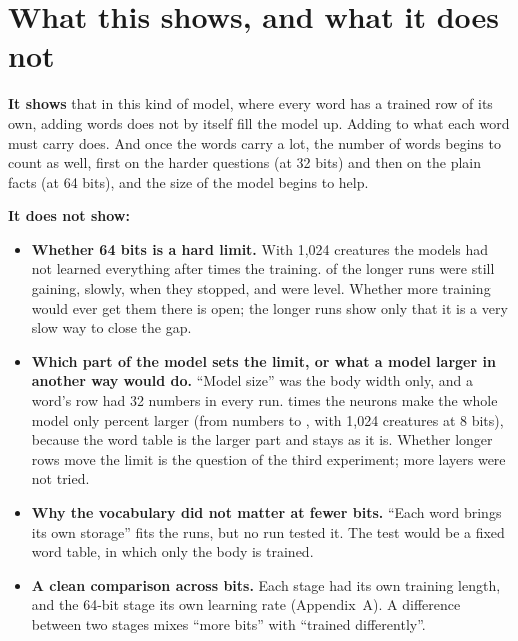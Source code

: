 \documentclass[10pt,letterpaper]{article}
\newcommand{\lead}[1]{\textbf{#1}}               %
\begin{document}
\section{What this shows, and what it does not}

\lead{It shows} that in this kind of model, where every word has a trained row of its own, adding
words does not by itself fill the model up. Adding to what each word must carry does. And once the
words carry a lot, the number of words begins to count as well, first on the harder questions (at
32 bits) and then on the plain facts (at 64 bits), and the size of the model begins to help.

\lead{It does not show:}
\begin{itemize}
\item \lead{Whether 64 bits is a hard limit.} With 1,024 creatures the models had not learned
      everything after \LongerTimesWord{} times the training. \LongerStillWordCap{} of the
      \RunsLongerWord{} longer runs were still gaining, slowly, when they stopped, and
      \LongerLevelWord{} were level. Whether more training would ever get them there is open; the
      longer runs show only that it is a very slow way to close the gap.
\item \lead{Which part of the model sets the limit, or what a model larger in another way would
      do.} ``Model size'' was the body width only, and a word's row had 32 numbers in every run.
      \BodyTimesWordCap{} times the neurons make the whole model only \ModelGrowthPercent{}
      percent larger (from \ModelNarrow{} numbers to \ModelWide, with 1,024 creatures at 8 bits),
      because the word table is the larger part and stays as it is. Whether longer rows move the limit is
      the question of the third experiment; more layers were not tried.
\item \lead{Why the vocabulary did not matter at fewer bits.} ``Each word brings its own storage''
      fits the runs, but no run tested it. The test would be a fixed word table, in which only the
      body is trained.
\item \lead{A clean comparison across bits.} Each stage had its own training length, and the 64-bit
      stage its own learning rate (Appendix~A). A difference between two stages mixes ``more bits''
      with ``trained differently''.
\end{itemize}
\end{document}
